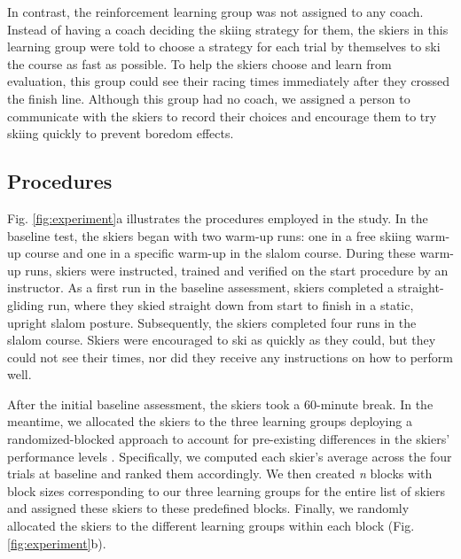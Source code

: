 \documentclass[pdflatex,sn-nature]{sn-jnl}%
\theoremstyle{thmstyleone}%
\theoremstyle{thmstyletwo}%
\theoremstyle{thmstylethree}%
\begin{document}
In contrast, the reinforcement learning group was not assigned to any coach. Instead of having a coach deciding the skiing strategy for them, the skiers in this learning group were told to choose a strategy for each trial by themselves to ski the course as fast as possible. To help the skiers choose and learn from evaluation, this group could see their racing times immediately after they crossed the finish line. Although this group had no coach, we assigned a person to communicate with the skiers to record their choices and encourage them to try skiing quickly to prevent boredom effects.

\subsection{Procedures}\label{procedure}
Fig. \ref{fig:experiment}a illustrates the procedures employed in the study. 
In the baseline test, the skiers began with two warm-up runs: one in a free skiing warm-up course and one in a specific warm-up in the slalom course. During these warm-up runs, skiers were instructed, trained and verified on the start procedure by an instructor. As a first run in the baseline assessment, skiers completed a straight-gliding run, where they skied straight down from start to finish in a static, upright slalom posture. Subsequently, the skiers completed four runs in the slalom course. Skiers were encouraged to ski as quickly as they could, but they could not see their times, nor did they receive any instructions on how to perform well.

After the initial baseline assessment, the skiers took a 60-minute break. In the meantime, we allocated the skiers to the three learning groups deploying a randomized-blocked approach to account for pre-existing differences in the skiers’ performance levels \cite{maxwell_designing_2017}. Specifically, we computed each skier’s average across the four trials at baseline and ranked them accordingly. We then created \textit{n} blocks with block sizes corresponding to our three learning groups for the entire list of skiers and assigned these skiers to these predefined blocks. Finally, we randomly allocated the skiers to the different learning groups within each block (Fig. \ref{fig:experiment}b).
\end{document}
